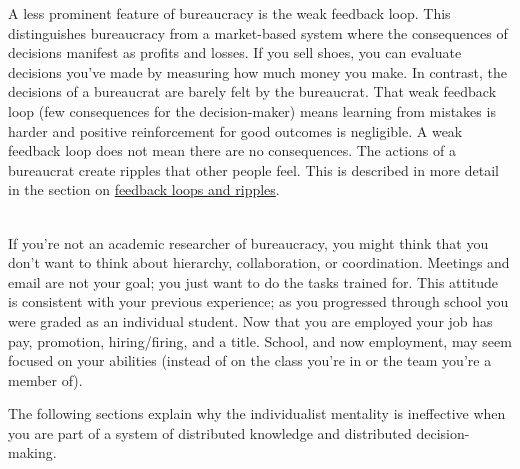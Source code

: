 A less prominent feature of bureaucracy is the weak 
\gls{feedback loop}. 
 \iftoggle{glossaryinmargin}{\marginpar{[Glossary]}}{}%
 This distinguishes bureaucracy from a market-based system where the consequences of decisions manifest as profits and losses. If you sell shoes, you can evaluate decisions you've made by measuring how much money you make. In contrast, the decisions of a bureaucrat are barely felt by the bureaucrat. That weak feedback loop (few consequences for the decision-maker) means learning from mistakes is harder and positive reinforcement for good outcomes is negligible. A weak feedback loop does not mean there are no consequences. The actions of a bureaucrat create ripples that other people feel. This is described in more detail in the section on \hyperref[sec:feedback-loop-and-ripples]{feedback loops and ripples}.

\ \\

If you're not an academic researcher of bureaucracy, you might think that you don't want to think about hierarchy, collaboration, or coordination. Meetings and email are not your goal; you just want to do the tasks trained for. This attitude is consistent with your previous experience; as you progressed through school you were graded as an individual student. Now that you are employed your job has pay, promotion, hiring/firing, and a title. School, and now employment, may seem focused on your abilities (instead of on the class you're in or the team you're a member of). 

The following sections explain why the individualist mentality is ineffective when you are part of a system of distributed knowledge and distributed decision-making. 


